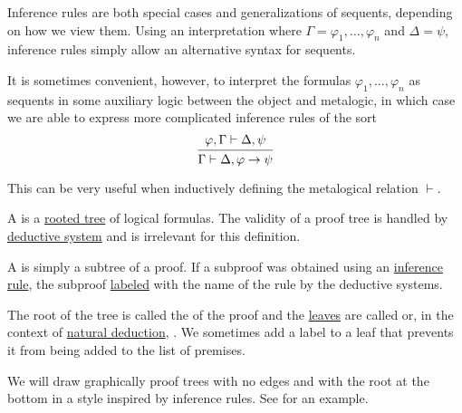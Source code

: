 \begin{remark}\label{rem:sequents_inference_rules}
  Inference rules are both special cases and generalizations of sequents, depending on how we view them. Using an interpretation where \( \Gamma = \varphi_1, \ldots, \varphi_n \) and \( \Delta = \psi \), inference rules simply allow an alternative syntax for sequents.

  It is sometimes convenient, however, to interpret the formulas \( \varphi_1, \ldots, \varphi_n \) as sequents in some auxiliary logic between the object and metalogic, in which case we are able to express more complicated inference rules of the sort
  \begin{equation*}
    \begin{prooftree}
      \hypo{ \varphi, \Gamma \vdash \Delta, \psi }
      \infer1{ \Gamma \vdash \Delta, \varphi \to \psi }
    \end{prooftree}
  \end{equation*}

  This can be very useful when inductively defining the metalogical relation \( \vdash \).
\end{remark}

\begin{definition}\label{def:proof_tree}\mimprovised
  A  is a \hyperref[def:arborescence/undirected]{rooted tree} of logical formulas. The validity of a proof tree is handled by \hyperref[def:deductive_system]{deductive system} and is irrelevant for this definition.

  \begin{thmenum}
     A  is simply a subtree of a proof. If a subproof was obtained using an \hyperref[def:judgment/inference_rule]{inference rule}, the subproof \hyperref[def:weighted_set]{labeled} with the name of the rule by the deductive systems.

     The root of the tree is called the  of the proof and the \hyperref[def:arborescence/ancestry]{leaves} are called  or, in the context of \hyperref[def:natural_deduction_system]{natural deduction}, . We sometimes add a  label to a leaf that prevents it from being added to the list of premises.

     We will draw graphically proof trees with no edges and with the root at the bottom in a style inspired by inference rules. See  for an example.
  \end{thmenum}
\end{definition}

